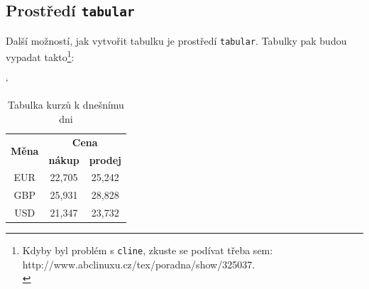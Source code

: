 \documentclass[a4paper,11pt, hidelinks]{article}
\begin{document}
\subsection{Prostředí \texttt{tabular}}
Další možností, jak vytvořit tabulku je prostředí \texttt{tabular}. Tabulky pak budou vypadat takto\footnote[1]{Kdyby byl problém s \texttt{cline}, zkuste se podívat třeba sem: http://www.abclinuxu.cz/tex/poradna/show/325037.\\[6em]}: %

\begin{table}[h]
\catcode`
\centering
\begin{tabular}{|c|c|c|}
    \hline
    \multirow{2}{*}{\textbf{Měna}} & \multicolumn{2}{|c|}{\textbf{Cena}} \\
    \cline{2-3} %
     & \textbf{nákup} & \textbf{prodej} \\
    \hline
    EUR & 22,705 & 25,242 \\
    GBP & 25,931 & 28,828 \\
    USD & 21,347 & 23,732 \\
    \hline
\end{tabular}
\caption{Tabulka kurzů k dnešnímu dni}
\label{tab:1}
\end{table}
\end{document}
